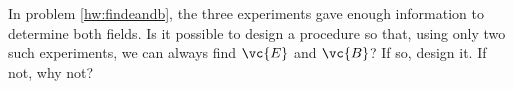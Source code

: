 In problem \ref{hw:findeandb}, the three experiments gave enough
        information to determine both fields.
        Is it possible to design a procedure so that, using only two such experiments,
        we can always find $\vc{E}$ and $\vc{B}$? If so, design it. If not, why not?
